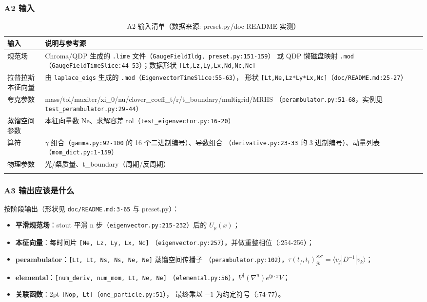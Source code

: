 \documentclass[UTF8]{ctexart}
\begin{document}
\subsubsection{A2 输入}
\begin{xltabular}{\textwidth}{lX}
\toprule
\textcolor{struct}{输入} & 说明与参考源 \\
\midrule
\endhead
规范场 & Chroma/QDP 生成的 \texttt{.lime} 文件（\texttt{GaugeFieldIldg, preset.py:151-159}）
或 QDP 懒磁盘映射 \texttt{.mod}（\texttt{GaugeFieldTimeSlice:44-53}）；数据形状
\texttt{[Lt,Lz,Ly,Lx,Nd,Nc,Nc]} \\
拉普拉斯本征向量 & 由 \texttt{laplace\_eigs} 生成的 \texttt{.mod}（\texttt{EigenvectorTimeSlice:55-63}），
形状 \texttt{[Lt,Ne,Lz*Ly*Lx,Nc]}（\texttt{doc/README.md:25-27}） \\
夸克参数 & mass/tol/maxiter/xi\_0/nu/clover\_coeff\_t/r/t\_boundary/multigrid/MRHS
（\texttt{perambulator.py:51-68}，实例见 \texttt{test\_perambulator.py:29-44}） \\
蒸馏空间参数 & 本征向量数 Ne、求解容差 tol（\texttt{test\_eigenvector.py:16-20}） \\
算符 & $\gamma$ 组合（\texttt{gamma.py:92-100} 的 16 个二进制编号）、导数组合
（\texttt{derivative.py:23-33} 的 3 进制编号）、动量列表（\texttt{mom\_dict.py:1-159}） \\
物理参数 & 光/粲质量、t\_boundary（周期/反周期）\\
\bottomrule
\caption{A2 输入清单（数据来源: preset.py/doc README 实测）}
\end{xltabular}

\subsubsection{A3 输出应该是什么}
按阶段输出（形状见 \texttt{doc/README.md:3-65} 与 preset.py）：
\begin{itemize}
\item \textbf{平滑规范场}：stout 平滑 n 步（\texttt{eigenvector.py:215-232}）后的 $U_\mu(x)$；
\item \textbf{本征向量}：每时间片 \texttt{[Ne, Lz, Ly, Lx, Nc]}
（\texttt{eigenvector.py:257}），并做重整相位（:254-256）；
\item \textbf{perambulator}：\texttt{[Lt, Lt, Ns, Ns, Ne, Ne]} 蒸馏空间传播子
（\texttt{perambulator.py:102}），$\tau(t_f,t_i)^{SS'}_{jk}=\langle v_j | D^{-1} | v_k\rangle$；
\item \textbf{elemental}：\texttt{[num\_deriv, num\_mom, Lt, Ne, Ne]}
（\texttt{elemental.py:56}），$V^\dagger(\nabla^n)e^{ip\cdot x}V$；
\item \textbf{关联函数}：2pt \texttt{[Nop, Lt]}（\texttt{one\_particle.py:51}），
最终乘以 $-1$ 为约定符号（:74-77）。
\end{itemize}
\end{document}
